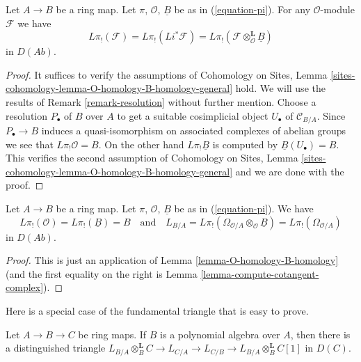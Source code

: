 \begin{lemma}
\label{lemma-O-homology-B-homology}
Let $A \to B$ be a ring map. Let $\pi$, $\mathcal{O}$, $\underline{B}$
be as in (\ref{equation-pi}). For any $\mathcal{O}$-module $\mathcal{F}$
we have
$$
L\pi_!(\mathcal{F}) = L\pi_!(Li^*\mathcal{F}) =
L\pi_!(\mathcal{F} \otimes_\mathcal{O}^\mathbf{L} \underline{B})
$$
in $D(\textit{Ab})$.
\end{lemma}

\begin{proof}
It suffices to verify the assumptions of
Cohomology on Sites, Lemma
\ref{sites-cohomology-lemma-O-homology-B-homology-general}
hold. We will use the results of Remark \ref{remark-resolution} without
further mention.
Choose a resolution $P_\bullet$ of $B$ over $A$ to get a
suitable cosimplicial object $U_\bullet$ of $\mathcal{C}_{B/A}$.
Since $P_\bullet \to B$ induces a quasi-isomorphism on associated
complexes of abelian groups we see that $L\pi_!\mathcal{O} = B$.
On the other hand $L\pi_!\underline{B}$ is computed by
$\underline{B}(U_\bullet) = B$. This verifies the second assumption of
Cohomology on Sites, Lemma
\ref{sites-cohomology-lemma-O-homology-B-homology-general}
and we are done with the proof.
\end{proof}

\begin{lemma}
\label{lemma-apply-O-B-comparison}
Let $A \to B$ be a ring map. Let $\pi$, $\mathcal{O}$, $\underline{B}$
be as in (\ref{equation-pi}). We have
$$
L\pi_!(\mathcal{O}) = L\pi_!(\underline{B}) = B
\quad\text{and}\quad
L_{B/A} = L\pi_!(\Omega_{\mathcal{O}/A} \otimes_\mathcal{O} \underline{B}) =
L\pi_!(\Omega_{\mathcal{O}/A})
$$
in $D(\textit{Ab})$.
\end{lemma}

\begin{proof}
This is just an application of Lemma \ref{lemma-O-homology-B-homology}
(and the first equality on the right is
Lemma \ref{lemma-compute-cotangent-complex}).
\end{proof}

\noindent
Here is a special case of the fundamental triangle that is easy to prove.

\begin{lemma}
\label{lemma-special-case-triangle}
Let $A \to B \to C$ be ring maps. If $B$ is a polynomial algebra over
$A$, then there is a distinguished triangle 
$L_{B/A} \otimes_B^\mathbf{L} C \to L_{C/A} \to L_{C/B} \to
L_{B/A} \otimes_B^\mathbf{L} C[1]$ in $D(C)$.
\end{lemma}

